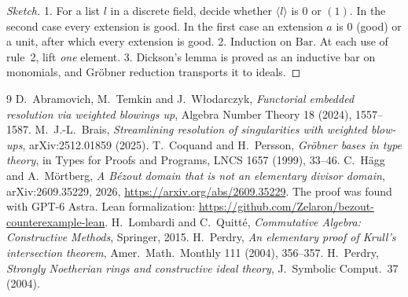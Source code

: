 \documentclass[11pt]{article}
\numberwithin{equation}{section}
\theoremstyle{plain}
\theoremstyle{definition}
\theoremstyle{remark}
\newtheorem*{comment}{Comment}
\begin{document}
\begin{proof}[Sketch]
1. For a list $l$ in a discrete field, decide whether $\langle l\rangle$ is $0$ or $(1)$. In the
second case every extension is good. In the first case an extension $a$ is $0$ (good) or a unit,
after which every extension is good.
2. Induction on $\mathrm{Bar}$. At each use of rule~2, lift \emph{one} element.
3. Dickson's lemma is proved as an inductive bar on monomials, and Gröbner reduction transports it
to ideals.
\end{proof}

\begin{thebibliography}{9}
 D.~Abramovich, M.~Temkin and J.~Włodarczyk, \emph{Functorial embedded resolution via
  weighted blowings up}, Algebra Number Theory 18 (2024), 1557--1587.
 M.~J.-L.~Brais, \emph{Streamlining resolution of singularities with weighted
  blow-ups}, arXiv:2512.01859 (2025).
 T.~Coquand and H.~Persson, \emph{Gröbner bases in type theory}, in Types for Proofs and
  Programs, LNCS 1657 (1999), 33--46.
 C.~Hägg and A.~Mörtberg, \emph{A Bézout domain that is not an elementary divisor domain},
  arXiv:2609.35229, 2026, \url{https://arxiv.org/abs/2609.35229}. The proof was found with GPT-6 Astra.
  Lean formalization: \url{https://github.com/Zelaron/bezout-counterexample-lean}.
 H.~Lombardi and C.~Quitté, \emph{Commutative Algebra: Constructive Methods},
  Springer, 2015.
 H.~Perdry, \emph{An elementary proof of Krull's intersection theorem}, Amer.\ Math.\
  Monthly 111 (2004), 356--357.
 H.~Perdry, \emph{Strongly Noetherian rings and constructive ideal theory},
  J.~Symbolic Comput.\ 37 (2004).
\end{thebibliography}
\end{document}
